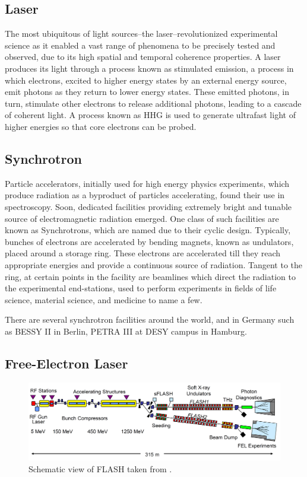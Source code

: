\subsection{Laser}
The most ubiquitous of light sources--the laser--revolutionized experimental science as it enabled a vast range of phenomena to be precisely tested and observed, due to its high spatial and temporal coherence properties. A laser produces its light through a process known as stimulated emission, a process in which electrons, excited to higher energy states by an external energy source, emit photons as they return to lower energy states. These emitted photons, in turn, stimulate other electrons to release additional photons, leading to a cascade of coherent light. A process known as \gls{HHG} is used to generate ultrafast light of higher energies so that core electrons can be probed.  

\subsection{Synchrotron}
Particle accelerators, initially used for high energy physics experiments, which produce radiation as a byproduct of particles accelerating, found their use in spectroscopy. Soon, dedicated facilities providing extremely bright and tunable source of electromagnetic radiation emerged. One class of such facilities are known as Synchrotrons, which are named due to their cyclic design. Typically, bunches of electrons are accelerated by bending magnets, known as \glspl{undulator}, placed around a storage ring. These electrons are accelerated till they reach appropriate energies and provide a continuous source of radiation. Tangent to the ring, at certain points in the facility are beamlines which direct the radiation to the experimental end-stations, used to perform experiments in fields of life science, material science, and medicine to name a few.

There are several synchrotron facilities around the world, and in Germany such as BESSY II in Berlin, PETRA III at DESY campus in Hamburg.

\subsection{Free-Electron Laser}
\begin{figure}
    \includegraphics[width=1\linewidth]{images/flash_fel.png}
    \caption{Schematic view of \gls{FLASH} taken from \cite{faatzSimultaneousOperationTwo2016}.}
\end{figure}

